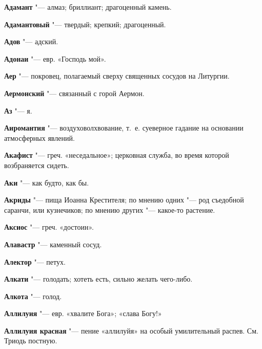 \begin{mymulticols}{2}
\noindent\textbf{Адамант} "--- алмаз; бриллиант; драгоценный камень. 




\noindent\textbf{Адамантовый} "--- твердый; крепкий; драгоценный. 




\noindent\textbf{Адов} "--- адский. 




\noindent\textbf{Адонаи} "--- евр. «Господь мой». 




\noindent\textbf{Аер} "--- покровец, полагаемый сверху священных сосудов на Литургии. 




\noindent\textbf{Аермонский} "--- связанный с горой Аермон. 




\noindent\textbf{Аз} "--- я. 




\noindent\textbf{Аиромантия} "--- воздуховолхвование, т.~е. суеверное гадание на основании атмосферных явлений. 




\noindent\textbf{Акафист} "--- греч. «неседальное»; церковная служба, во время которой возбраняется сидеть. 




\noindent\textbf{Аки} "--- как будто, как бы. 




\noindent\textbf{Акриды} "--- пища Иоанна Крестителя; по мнению одних "--- род съедобной саранчи, или кузнечиков; по мнению других "--- какое-то растение. 




\noindent\textbf{Аксиос} "--- греч. «достоин». 




\noindent\textbf{Алавастр} "--- каменный сосуд. 




\noindent\textbf{Алектор} "--- петух. 




\noindent\textbf{Алкати} "--- голодать; хотеть есть, сильно желать чего-либо. 




\noindent\textbf{Алкота} "--- голод. 




\noindent\textbf{Аллилуия} "--- евр. «хвалите Бога»; «слава Богу!» 




\noindent\textbf{Аллилуия красная} "--- пение «аллилуйя» на особый умилительный распев. См. Триодь постную. 





\end{mymulticols}
